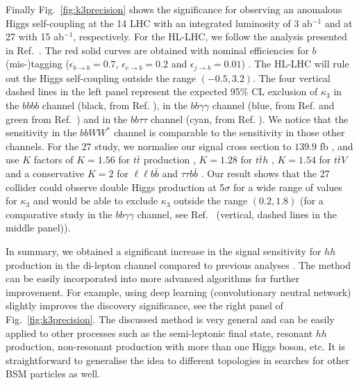 Finally Fig.~\ref{fig:k3precision} shows the significance for observing an anomalous Higgs self-coupling at the 14 \UTeV LHC with an integrated luminosity of 3 ab$^{-1}$ and at 27 \UTeV with 15 ab$^{-1}$, respectively. 
For the HL-LHC, we follow the analysis presented in Ref.~\cite{Kim:2018cxf}.
The red solid curves are obtained with nominal efficiencies for $b$ (mis-)tagging ($\epsilon_{b \to b} = 0.7$, $\epsilon_{c \to b} = 0.2$ and $\epsilon_{j \to b} = 0.01$) \cite{Sirunyan:2017ezt}. 
The HL-LHC will rule out the Higgs self-coupling outside the range $(-0.5, 3.2)$. The four vertical dashed lines in the left panel represent the expected 95\% CL exclusion of $\kappa_3$ in the $bbbb$ channel (black, from Ref. \cite{ATL-PHYS-PUB-2016-024}), in the $bb\gamma\gamma$ channel (blue, from Ref. \cite{Kling:2016lay} and green from Ref.~\cite{ATL-PHYS-PUB-2017-001}) and in the $bb\tau\tau$ channel (cyan, from Ref. \cite{Kim:2018uty}). We notice that the sensitivity in the $bbWW^*$ channel is comparable to the sensitivity in those other channels.  
For the 27 \UTeV study, we normalise our signal cross section to $139.9$ fb \cite{Grazzini:2018bsd}, and use $K$ factors of $K=1.56$ for $t\bar t$ production \cite{27TeV:ttbar}, $K=1.28$ for $t\bar  t h$ \cite{Demartin:2014fia}, $K=1.54$ for $t \bar t V$ and a conservative $K=2$ for $\ell\ell b \bar b$ and $\tau\tau b\bar b$ \cite{Kim:2018cxf}. 
Our result shows that the 27 \UTeV collider could observe double Higgs production at 5$\sigma$ for a wide range of values for $\kappa_3$ and would be able to exclude $\kappa_3$ outside the range $(0.2, 1.8)$ (for a comparative study in the $bb\gamma\gamma$ channel, see Ref.~\cite{Goncalves:2018qas} (vertical, dashed lines in the middle panel)).


In summary, we obtained a significant increase in the signal sensitivity for $hh$ production in the di-lepton channel compared to previous analyses \cite{CMS:2015nat,CMS:2017cwx,Adhikary:2017jtu}. 
The method can be easily incorporated into more advanced algorithms for further improvement. 
For example, using deep learning (convolutionary neutral network) slightly improves the discovery significance, see the right panel of Fig.~\ref{fig:k3precision}.
The discussed method is very general and can be easily applied to other processes such as the semi-leptonic final state, resonant $hh$ production, non-resonant production with more than one Higgs boson, etc. It is straightforward to generalise the idea to different topologies in searches for other BSM particles as well.









